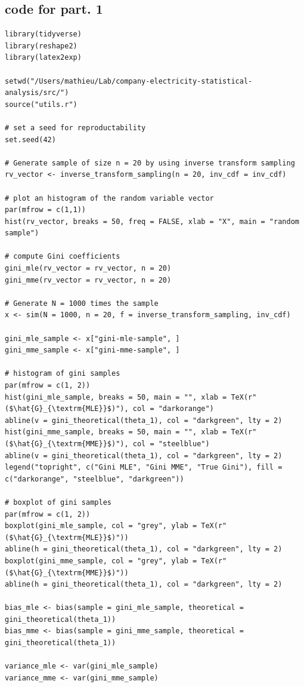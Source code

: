 \subsection{code for part. 1}

\begin{verbatim}
library(tidyverse)
library(reshape2)
library(latex2exp)

setwd("/Users/mathieu/Lab/company-electricity-statistical-analysis/src/")
source("utils.r")

# set a seed for reproductability
set.seed(42)

# Generate sample of size n = 20 by using inverse transform sampling
rv_vector <- inverse_transform_sampling(n = 20, inv_cdf = inv_cdf)

# plot an histogram of the random variable vector
par(mfrow = c(1,1))
hist(rv_vector, breaks = 50, freq = FALSE, xlab = "X", main = "random sample")

# compute Gini coefficients
gini_mle(rv_vector = rv_vector, n = 20)
gini_mme(rv_vector = rv_vector, n = 20)

# Generate N = 1000 times the sample
x <- sim(N = 1000, n = 20, f = inverse_transform_sampling, inv_cdf)

gini_mle_sample <- x["gini-mle-sample", ]
gini_mme_sample <- x["gini-mme-sample", ]

# histogram of gini samples
par(mfrow = c(1, 2))
hist(gini_mle_sample, breaks = 50, main = "", xlab = TeX(r"($\hat{G}_{\textrm{MLE}}$)"), col = "darkorange")
abline(v = gini_theoretical(theta_1), col = "darkgreen", lty = 2)
hist(gini_mme_sample, breaks = 50, main = "", xlab = TeX(r"($\hat{G}_{\textrm{MME}}$)"), col = "steelblue")
abline(v = gini_theoretical(theta_1), col = "darkgreen", lty = 2)
legend("topright", c("Gini MLE", "Gini MME", "True Gini"), fill = c("darkorange", "steelblue", "darkgreen"))

# boxplot of gini samples
par(mfrow = c(1, 2))
boxplot(gini_mle_sample, col = "grey", ylab = TeX(r"($\hat{G}_{\textrm{MLE}}$)"))
abline(h = gini_theoretical(theta_1), col = "darkgreen", lty = 2)
boxplot(gini_mme_sample, col = "grey", ylab = TeX(r"($\hat{G}_{\textrm{MME}}$)"))
abline(h = gini_theoretical(theta_1), col = "darkgreen", lty = 2)

bias_mle <- bias(sample = gini_mle_sample, theoretical = gini_theoretical(theta_1))
bias_mme <- bias(sample = gini_mme_sample, theoretical = gini_theoretical(theta_1))

variance_mle <- var(gini_mle_sample)
variance_mme <- var(gini_mme_sample)


\end{verbatim}
